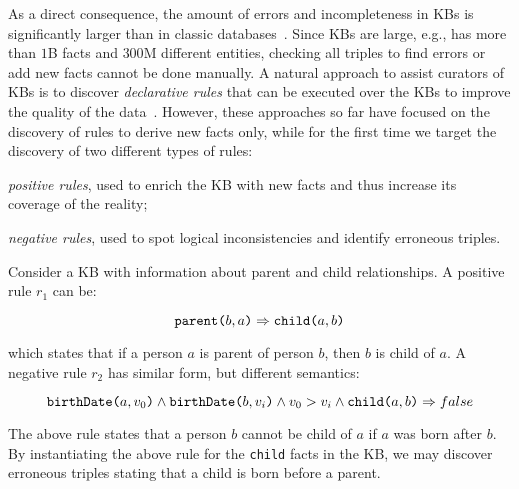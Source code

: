 As a direct consequence, the amount of errors and incompleteness in KBs is significantly larger than in classic databases~\cite{suchanek2009sofie}.
Since KBs are large, e.g., \wikidata has more than $1$B facts and $300$M different entities, %
checking all triples to find errors or add new facts cannot be done manually. %
A natural approach to assist curators of KBs is to discover %
\emph{declarative rules} that can be executed over the KBs to improve the quality of the data~\cite{Chen:2016,abedjan2014amending,galarraga2015fast}. However, these approaches so far have focused on the discovery of rules to derive new facts only, while for the first time
we target the discovery %
of two different types of rules:
\begin{inparaenum}[\itshape(i)]
	\item {\em positive rules}, used to enrich the KB with new facts and thus increase its coverage of the reality;
	\item {\em negative rules}, used to spot logical inconsistencies and identify erroneous triples.
\end{inparaenum}

\begin{example}\label{ex:krd_intro}
	Consider a KB with information about parent and child relationships.
	A positive rule $r_1$ can be:
	
	\vspace{-1ex}
	{\small
		\begin{equation*}
			\texttt{parent(}b,a\texttt{)} \Rightarrow \texttt{child(}a,b\texttt{)}
		\end{equation*}
	} 
	\vspace{-2ex}
	
	\noindent
	which states that if a person $a$ is parent of person $b$, then $b$ is child of $a$. 
	A negative rule $r_2$ has similar form, but different semantics:
	
	\vspace{-2.5ex}
	{\small
		\begin{equation*}
			\texttt{birthDate(}a,v_0\texttt{)} \wedge \texttt{birthDate(}b,v_i\texttt{)} \wedge v_0 > v_i \wedge  \texttt{child(}a,b\texttt{)}  \Rightarrow false
		\end{equation*}
	} 
	\vspace{-2ex}
	
	\noindent The above rule states that a person $b$ cannot be child of $a$ if $a$ was born after $b$. By instantiating the above rule for the \texttt{child} facts in the KB, we may discover erroneous triples stating that a child is born before a parent.
\end{example}

